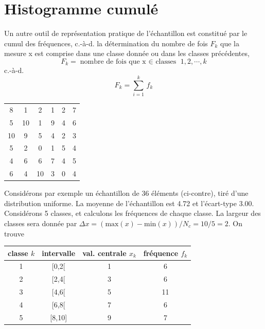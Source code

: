 \documentclass[main.tex]{subfiles}
\begin{document}
\section{Histogramme cumulé}

Un autre outil de représentation pratique de l'échantillon est constitué par le cumul des fréquences, c.-à-d. la détermination du nombre de fois $F_k$ que la mesure x est comprise dans une classe donnée ou dans les classes précédentes,
$$
    F_k=\text{nombre de fois que x $\in$ classes } 1,2,\cdots,k
$$
c.-à-d.
\begin{equation}
    F_k=\sum\limits_{i=1}^{k}\,f_k
\end{equation}
\begin{table}
    \centering
    \vspace{-6mm}
    \begin{tabular}{cccccc}
        8  & 1  & 2  & 1 & 2 & 7 \\
        5  & 10 & 1  & 9 & 4 & 6 \\
        10 & 9  & 5  & 4 & 2 & 3 \\
        5  & 2  & 0  & 1 & 5 & 4 \\
        4  & 6  & 6  & 7 & 4 & 5 \\
        6  & 4  & 10 & 3 & 0 & 4
    \end{tabular}
\end{table}
Considérons par exemple un échantillon de 36 éléments (ci-contre), tiré d'une distribution uniforme. La moyenne de l'échantillon est 4.72 et l'écart-type 3.00. Considérons 5 classes, et calculons les fréquences de chaque classe. La largeur des classes sera donnée par $\Delta x=(\text{max}(x)-\text{min}(x))/N_c=10/5=2$. On trouve
\begin{center}
    \begin{tabular}{cccc}
        classe $k$ & intervalle & val. centrale $x_k$ & fréquence $f_k$ \\\hline
        1          & [0,2[      & 1                   & 6               \\
        2          & [2,4[      & 3                   & 6               \\
        3          & [4,6[      & 5                   & 11              \\
        4          & [6,8[      & 7                   & 6               \\
        5          & [8,10]     & 9                   & 7               \\\hline
    \end{tabular}
\end{center}
\end{document}
